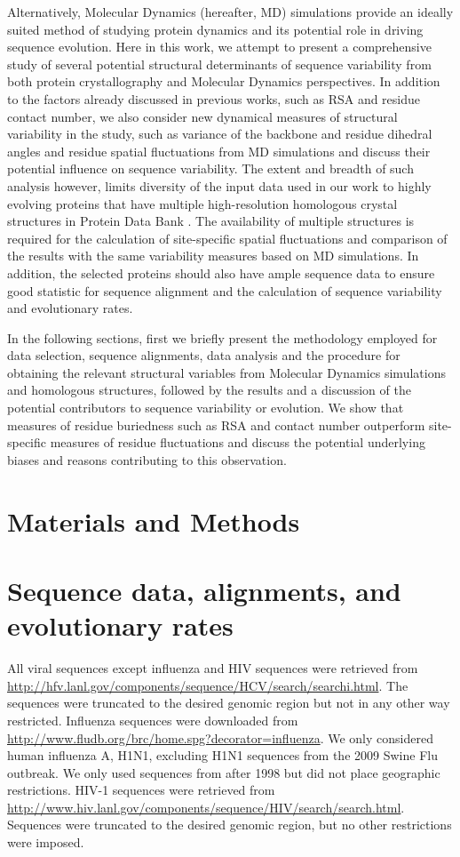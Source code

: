 \documentclass[12pt]{article}
\begin{document}
Alternatively, Molecular Dynamics (hereafter, MD) simulations provide an ideally suited method of studying protein dynamics and its potential role in driving sequence evolution.  Here in this work, we attempt to present a comprehensive study of several potential structural determinants of sequence variability from both protein crystallography and Molecular Dynamics perspectives. In addition to the factors already discussed in previous works, such as RSA and residue contact number, we also consider new dynamical measures of structural variability in the study, such as variance of the backbone and residue dihedral angles and residue spatial fluctuations from MD simulations and discuss their potential influence on sequence variability. The extent and breadth of such analysis however, limits diversity of the input data used in our work to highly evolving proteins that have multiple high-resolution homologous crystal structures in Protein Data Bank \citep{berman_protein_2008}. The availability of multiple structures is required for the calculation of site-specific spatial fluctuations and comparison of the results with the same variability measures based on MD simulations. In addition, the selected proteins should also have ample sequence data to ensure good statistic for sequence alignment and the calculation of sequence variability and evolutionary rates.
	
In the following sections, first we briefly present the methodology employed for data selection, sequence alignments, data analysis and the procedure for obtaining the relevant structural variables from Molecular Dynamics simulations and homologous structures, followed by the results and a discussion of the potential contributors to sequence variability or evolution. We show that measures of residue buriedness such as RSA and contact number outperform site-specific measures of residue fluctuations and discuss the potential underlying biases and reasons contributing to this observation.

\section*{Materials and Methods}

\section*{Sequence data, alignments, and evolutionary rates}

All viral sequences except influenza and HIV sequences were retrieved from \url{http://hfv.lanl.gov/components/sequence/HCV/search/searchi.html}.
The sequences were truncated to the desired genomic region but not in any other way restricted. Influenza sequences were downloaded from \url{http://www.fludb.org/brc/home.spg?decorator=influenza}. We only considered human influenza A, H1N1, excluding H1N1 sequences from the 2009 Swine Flu outbreak. We only used sequences from after 1998 but did not place geographic restrictions. HIV-1 sequences were retrieved from \url{http://www.hiv.lanl.gov/components/sequence/HIV/search/search.html}.
Sequences were truncated to the desired genomic region, but no other restrictions were imposed.
\end{document}
